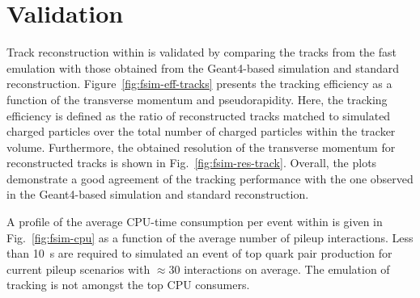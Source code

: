 \section{Validation}

Track reconstruction within \FSIM is validated by comparing the tracks from the fast emulation with those obtained from the Geant4-based simulation and standard reconstruction. Figure~\ref{fig:fsim-eff-tracks} presents the tracking efficiency as a function of the transverse momentum and pseudorapidity. Here, the tracking efficiency is defined as the ratio of reconstructed tracks matched to simulated charged particles over the total number of charged particles within the tracker volume. Furthermore, the obtained resolution of the transverse momentum for reconstructed tracks is shown in Fig.~\ref{fig:fsim-res-track}. Overall, the plots demonstrate a good agreement of the \FSIM tracking performance with the one observed in the Geant4-based simulation and standard reconstruction.


A profile of the average CPU-time consumption per event within \FSIM is given in Fig.~\ref{fig:fsim-cpu} as a function of the average number of pileup interactions. Less than 10~s are required to simulated an event of top quark pair production for current pileup scenarios with $\approx30$ interactions on average. The emulation of tracking is not amongst the top CPU consumers.

